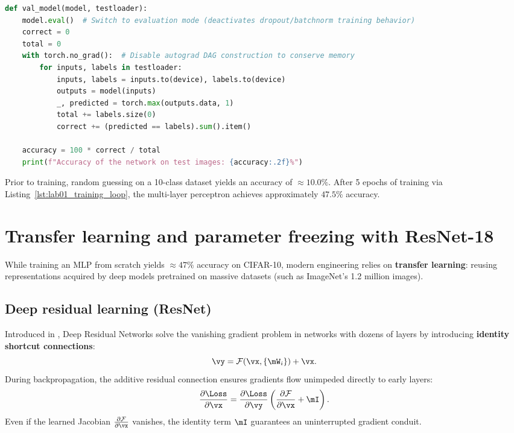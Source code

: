 \documentclass[../labs.tex]{subfiles}
\begin{document}
\begin{lstlisting}[language=Python, caption={Validation routine with \texttt{model.eval()} and \texttt{torch.no\_grad()} (Cell 48).}, label={lst:lab01_val_model}]
def val_model(model, testloader):
    model.eval()  # Switch to evaluation mode (deactivates dropout/batchnorm training behavior)
    correct = 0
    total = 0
    with torch.no_grad():  # Disable autograd DAG construction to conserve memory
        for inputs, labels in testloader:
            inputs, labels = inputs.to(device), labels.to(device)
            outputs = model(inputs)
            _, predicted = torch.max(outputs.data, 1)
            total += labels.size(0)
            correct += (predicted == labels).sum().item()

    accuracy = 100 * correct / total
    print(f"Accuracy of the network on test images: {accuracy:.2f}%")
\end{lstlisting}

Prior to training, random guessing on a 10-class dataset yields an accuracy of $\approx 10.0\%$. After 5 epochs of training via Listing~\ref{lst:lab01_training_loop}, the multi-layer perceptron achieves approximately $47.5\%$ accuracy.


\section{Transfer learning and parameter freezing with ResNet-18}

While training an MLP from scratch yields $\approx 47\%$ accuracy on CIFAR-10, modern engineering relies on \textbf{transfer learning}: reusing representations acquired by deep models pretrained on massive datasets (such as ImageNet's 1.2 million images).

\subsection{Deep residual learning (ResNet)}
Introduced in \cite{he2016deep}, Deep Residual Networks solve the vanishing gradient problem in networks with dozens of layers by introducing \textbf{identity shortcut connections}:
\begin{equation}
\vy = \mathcal{F}(\vx, \{\mW_i\}) + \vx.
\end{equation}
During backpropagation, the additive residual connection ensures gradients flow unimpeded directly to early layers:
\begin{equation}
\frac{\partial \Loss}{\partial \vx} = \frac{\partial \Loss}{\partial \vy} \left( \frac{\partial \mathcal{F}}{\partial \vx} + \mI \right).
\end{equation}
Even if the learned Jacobian $\frac{\partial \mathcal{F}}{\partial \vx}$ vanishes, the identity term $\mI$ guarantees an uninterrupted gradient conduit.
\end{document}
